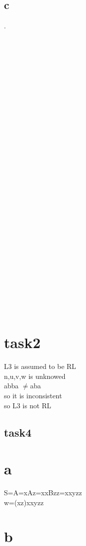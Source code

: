 \documentclass[10pt,a4paper]{article} \usepackage{listings} \usepackage[utf8]{inputenc} \usepackage[german]{babel} \usepackage{amsmath,amsfonts,amssymb,bbm} \usepackage[left=2cm,right=2cm,top=2cm,bottom=2cm]{geometry} \usepackage{minibox} \usepackage{graphicx,xcolor} \usepackage{subfigure} \usepackage{enumitem} \usepackage[hidelinks]{hyperref} \usepackage{xspace}
\begin{document}
\subsection{c}
.\\\\\\\\\\\\\\\\\\\\\\\\\\\\\\\\\\\\\\\\\\\\\\\\\\\\\\\\\\\\

\section{task2}
L3 is assumed to be RL\\
n,u,v,w is unknowed\\
abba $\neq$aba\\
so it is inconsistent\\
so L3 is not RL\\

\subsection{task4}
\section{a}
S=A=xAz=xxBzz=xxyzz\\
w=(xz)xxyzz\\
\section{b}
\end{document}
